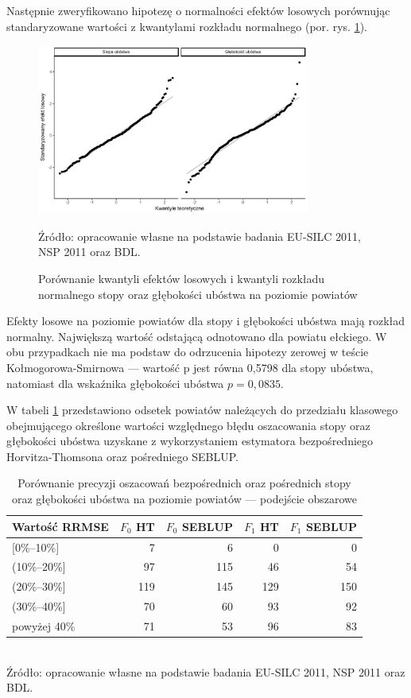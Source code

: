 Następnie zweryfikowano hipotezę o normalności efektów losowych porównując standaryzowane wartości z kwantylami rozkładu normalnego (por. rys. \ref{fig:fh_pow_u}).

\begin{figure}[htp]
\centering
\includegraphics[width=0.8\textwidth]{04_wykresy/fh_pow_u_model-1.pdf}
\caption{Porównanie kwantyli efektów losowych i kwantyli rozkładu normalnego stopy oraz głębokości ubóstwa na poziomie powiatów}
\small{Źródło: opracowanie własne na podstawie badania EU-SILC 2011, NSP 2011 oraz BDL.}
\label{fig:fh_pow_u}
\end{figure}

Efekty losowe na poziomie powiatów dla stopy i głębokości ubóstwa mają rozkład normalny. Największą wartość odstającą odnotowano dla powiatu ełckiego. W obu przypadkach nie ma podstaw do odrzucenia hipotezy zerowej w teście Kołmogorowa-Smirnowa --- wartość p jest równa 0,5798 dla stopy ubóstwa, natomiast dla wskaźnika głębokości ubóstwa $p=0,0835$.

W tabeli \ref{tab:fh_pow_prec} przedstawiono odsetek powiatów należących do przedziału klasowego obejmującego określone wartości względnego błędu oszacowania stopy oraz głębokości ubóstwa uzyskane z wykorzystaniem estymatora bezpośredniego Horvitza-Thomsona oraz pośredniego SEBLUP.

\begin{table}[htp]
\caption{Porównanie precyzji oszacowań bezpośrednich oraz pośrednich stopy oraz głębokości ubóstwa na poziomie powiatów --- podejście obszarowe}
\label{tab:fh_pow_prec}
\centering
\begin{tabular}{lrrrr}
\hline
Wartość RRMSE & $F_0$ HT & $F_0$ SEBLUP & $F_1$ HT & $F_1$ SEBLUP\tabularnewline
\hline
{[}0\%--10\%{]} & 7 & 6 & 0 & 0 \\
(10\%--20\%{]} & 97 & 115 & 46 & 54 \\
(20\%--30\%{]} & 119 & 145 & 129 & 150 \\
(30\%--40\%{]} & 70 & 60 & 93 & 92 \\
powyżej 40\% & 71 & 53 & 96 & 83 \\
\hline
\end{tabular}\\
\small{Źródło: opracowanie własne na podstawie badania EU-SILC 2011, NSP 2011 oraz BDL.}
\end{table}

